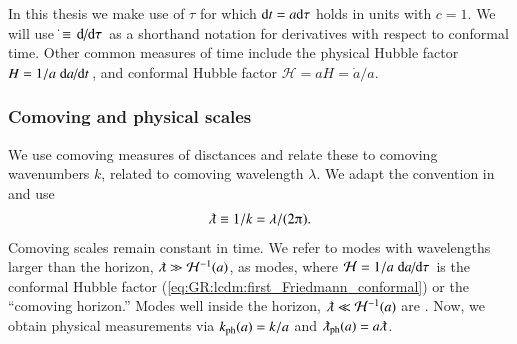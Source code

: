     In this thesis we make use of  $\tau$ for which ${\diff t} = a {\diff \tau}$ holds %
    in units with $c=1$. We will use $\dot{}\equiv\dv*{}{\tau}$ as a shorthand notation for derivatives with respect to conformal time. %
    Other common measures of time include the physical Hubble factor $H=1/a \dv*{a}{t}$, and conformal Hubble factor $\mathcal{H}= aH = \dot{a}/a$.



    \subsubsection{Comoving and physical scales}
    We use comoving measures of disctances and relate these to comoving wavenumbers $k$, related to comoving wavelength $\lambda$. We adapt the convention in~\citet{maggioreGravitationalWavesVol2018} and use 
    \begin{align}
        \lambdabar \equiv   1/k  = \lambda/(2\ppi).
    \end{align}
    Comoving scales remain constant in time. We refer to modes with wavelengths larger than the horizon, $\lambdabar\gg \mathcal{H}^{-1}(a)$, as  modes, where $\mathcal{H}=1/a \dv*{a}{\tau}$ is the conformal Hubble factor (\cref{eq:GR:lcdm:first_Friedmann_conformal}) or the ``comoving horizon.'' %
    Modes well inside the horizon, $\lambdabar\ll \mathcal{H}^{-1}(a)$ are . %
    Now, we obtain physical measurements via $k_\mathrm{ph}(a) = k /a$ and $\lambdabar\ped{ph}(a) = a \lambdabar$.

